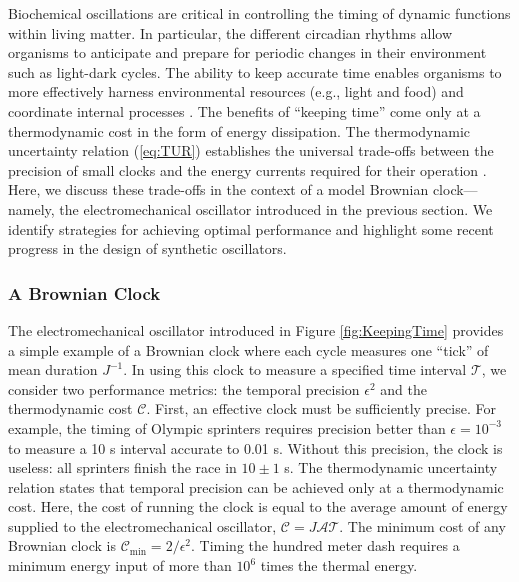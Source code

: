 \begin{appendices}
Biochemical oscillations are critical in controlling the timing of dynamic functions within living matter.  In particular, the different circadian rhythms allow organisms to anticipate and prepare for periodic changes in their environment such as light-dark cycles. The ability to keep accurate time enables organisms to more effectively harness environmental resources (e.g., light and food) and coordinate internal processes \cite{Sharma2003}. The benefits of ``keeping time'' come only at a thermodynamic cost \cite{Cao2015, Barato2016} in the form of energy dissipation. The thermodynamic uncertainty relation (\ref{eq:TUR}) establishes the universal trade-offs between the precision of small clocks and the energy currents required for their operation \cite{Barato2016}.  Here, we discuss these trade-offs in the context of a model Brownian clock---namely, the electromechanical oscillator introduced in the previous section.  We identify strategies for achieving optimal performance and highlight some recent progress in the design of synthetic oscillators. 

\subsubsection{A Brownian Clock}

The electromechanical oscillator introduced in Figure \ref{fig:KeepingTime} provides a simple example of a Brownian clock \cite{Barato2016} where each cycle measures one ``tick'' of mean duration $J^{-1}$.  In using this clock to measure a specified time interval $\mathcal{T}$, we consider two performance metrics: the temporal precision $\epsilon^2$ and the thermodynamic cost $\mathcal{C}$.  First, an effective clock must be sufficiently precise.  For example, the timing of Olympic sprinters requires precision better than $\epsilon=10^{-3}$ to measure a 10 s interval accurate to 0.01 s.  Without this precision, the clock is useless: all sprinters finish the race in $10\pm1$ s.  The thermodynamic uncertainty relation states that temporal precision can be achieved only at a thermodynamic cost.  Here, the cost of running the clock is equal to the average amount of energy supplied to the electromechanical oscillator, $\mathcal{C}= J\mathcal{A}\mathcal{T}$.  The minimum cost of any Brownian clock is $\mathcal{C}_{\min} = 2/\epsilon^2$.  Timing the hundred meter dash requires a minimum energy input of more than $10^{6}$ times the thermal energy.


\end{appendices}
